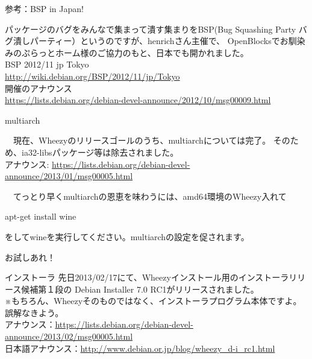 \begin{frame}{参考：BSP in Japan!}

 パッケージのバグをみんなで集まって潰す集まりをBSP(Bug Squashing Party
バグ潰しパーティー）というのですが、henrichさん主催で、
OpenBlocksでお馴染みのぷらっとホーム様のご協力のもと、日本でも開かれました。\\

BSP 2012/11 jp Tokyo\\
 \url{http://wiki.debian.org/BSP/2012/11/jp/Tokyo}\\
開催のアナウンス\\
 \url{https://lists.debian.org/debian-devel-announce/2012/10/msg00009.html}

\end{frame}

\begin{frame}[containsverbatim]{multiarch}

　現在、Wheezyのリリースゴールのうち、multiarchについては完了。
そのため、ia32-libsパッケージ等は除去されました。\\
アナウンス: \url{https://lists.debian.org/debian-devel-announce/2013/01/msg00005.html}

　てっとり早くmultiarchの恩恵を味わうには、amd64環境のWheezy入れて
\begin{commandline}
apt-get install wine
\end{commandline}

をしてwineを実行してください。multiarchの設定を促されます。
\begin{center}
\Large
お試しあれ！
\end{center}
\end{frame}


\begin{frame}{インストーラ}
先日2013/02/17にて、Wheezyインストール用のインストーラリリース候補第１段の
Debian Installer 7.0 RC1がリリースされました。\\
※もちろん、Wheezyそのものではなく、インストーラプログラム本体ですよ。誤解なきよう。\\
アナウンス：\url{https://lists.debian.org/debian-devel-announce/2013/02/msg00005.html}\\
日本語アナウンス：\url{http://www.debian.or.jp/blog/wheezy_d-i_rc1.html}

\end{frame}

